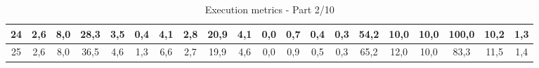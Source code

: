 \begin{sidewaystable}[]
\begin{tabular}{|c|c|c|c|c|c|c|c|c|c|c|c|c|c|c|c|c|c|c|c|}
    24 & 2,6                                              & 8,0                                              & 28,3                                             & 3,5                                              & 0,4                                              & 4,1                                              & 2,8                                              & 20,9                                             & 4,1                                              & 0,0                                              & 0,7                                              & 0,4                                              & 0,3                                              & 54,2                                            & 10,0                                            & 10,0                                            & 100,0                                           & 10,2                                            & 1,3                                             \\ \hline
    25 & 2,6                                              & 8,0                                              & 36,5                                             & 4,6                                              & 1,3                                              & 6,6                                              & 2,7                                              & 19,9                                             & 4,6                                              & 0,0                                              & 0,9                                              & 0,5                                              & 0,3                                              & 65,2                                            & 12,0                                            & 10,0                                            & 83,3                                            & 11,5                                            & 1,4                                             \\ \hline
    \end{tabular}
    \caption{Execution metrics - Part 2/10}
    \label{tab:ap:exec_metrics_2}
\end{sidewaystable}


